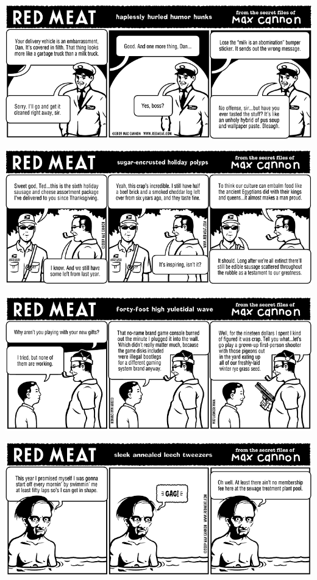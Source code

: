 \documentclass[a4paper,twoside,11pt]{article}
\begin{document}
\includegraphics[width=\textwidth]{redmeat_2009-12-15.png}



\includegraphics[width=\textwidth]{redmeat_2009-12-22.png}



\includegraphics[width=\textwidth]{redmeat_2009-12-29.png}



\includegraphics[width=\textwidth]{redmeat_2010-01-05.png}
\end{document}
